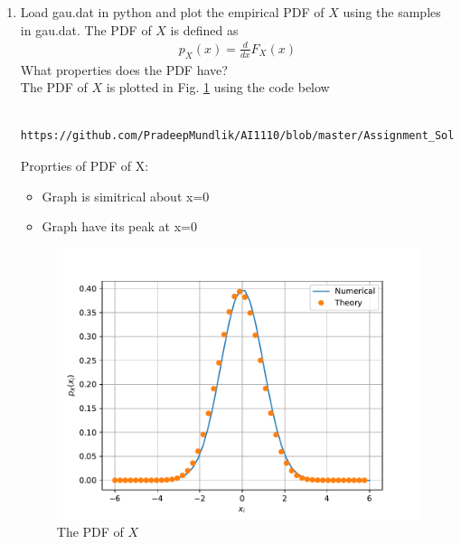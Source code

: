 \documentclass[journal,12pt,twocolumn]{IEEEtran}
\renewcommand\thesection{\arabic{section}}
\begin{document}
\begin{enumerate}[label=\thesection.\arabic*
,ref=\thesection.\theenumi]
\begin{itemize}
	\item As x approaches infinity the CDF approaches 1
	\item As x approaches minus infinity the CDF approaches 0 
\end{itemize}
\item
Load gau.dat in python and plot the empirical PDF of $X$ using the samples in gau.dat. The PDF of $X$ is defined as
\begin{align}
p_{X}(x) = \frac{d}{dx}F_{X}(x)
\end{align}
What properties does the PDF have?
\\
\solution The PDF of $X$ is plotted in Fig. \ref{fig:gauss_pdf} using the code below
\begin{lstlisting}
	https://github.com/PradeepMundlik/AI1110/blob/master/Assignment_Soln/codes/2/pdf_plot.py
\end{lstlisting}
Proprties of PDF of X:
\begin{itemize}
	\item Graph is simitrical about x=0
	\item Graph have its peak at x=0
\end{itemize}
\begin{figure}[h]
\centering
\includegraphics[width=\columnwidth]{figs/2/gauss_pdf.pdf}
\caption{The PDF of $X$}
\label{fig:gauss_pdf}
\end{figure}


\end{enumerate}
\end{document}
